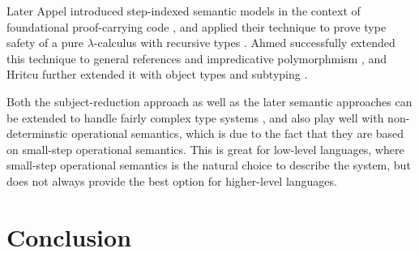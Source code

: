 \documentclass[a4paper,final,preprint,sort&compress]{elsarticle}
\begin{document}
Later Appel \ETAL introduced step-indexed semantic models in the context of
foundational proof-carrying code \cite{AppelFelty00}, and applied their technique
to prove type safety of a pure $\lambda$-calculus with recursive types
\cite{AppelMcAllester01}. Ahmed \ETAL successfully extended this technique to
general references and impredicative polymorphmism \cite{AhmedAppelVirga02,Ahmed04},
and Hritcu \ETAL further extended it with object types and subtyping
\cite{Hritcu07,HritcuSchwinghammer09}.

Both the subject-reduction approach as well as the later semantic approaches
can be extended to handle fairly complex type systems \cite{Pierce02}, and also play well with
non-determinstic operational semantics, which is due to the fact that they are
based on small-step operational semantics. This is great for low-level languages,
where small-step operational semantics is the natural choice to describe the
system, but does not always provide the best option for higher-level languages.



\section{Conclusion}
\label{sec:Conclusion}






\end{document}
